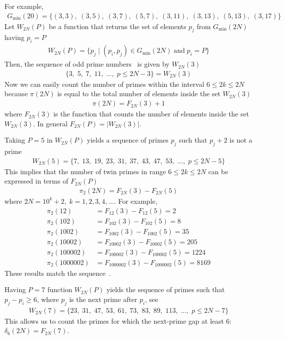 For example,
\begin{align*}
    G_{\min}(20) = \{
    (3,3),\;
    (3,5),\;
    (3,7),\;
    (5,7),\;
    (3,11),\;
    (3,13),\;
    (5,13),\;
    (3,17)
    \}
\end{align*}
Let $W_{2N}(P)$ be a function that returns the set of elements $p_j$ from $G_{\min} (2N)$ having $p_i=P$
\begin{align*}
    W_{2N}(P) = \{p_j \mid (p_i, p_j) \in G_{\min} (2N) \; \mathrm{and} \; p_i = P \}
\end{align*}
Then, the sequence of odd prime numbers~\cite{oeis:A065091} is given by $W_{2N}(3)$
\begin{align*}
    \{ 3, \; 5, \; 7, \; 11, \; \dots, \; p \leq 2N - 3\} = W_{2N}(3)
\end{align*}
Now we can easily count the number of primes within the interval $6 \leq 2k \leq 2N$ because $\pi(2N)$ is equal to
the total number of elements inside the set $W_{2N}(3)$
\begin{align*}
    \pi(2N) = F_{2N}(3) + 1
\end{align*}
where $F_{2N}(3)$ is the function that counts the number of elements inside the set $W_{2N}(3)$.
In general $F_{2N}(P) = |W_{2N}(3)|$.

Taking $P=5$ in $W_{2N}(P)$ yields a sequence of primes $p_j$ such that $p_j+2$ is not a prime~\cite{oeis:A049591}
\begin{align*}
    W_{2N}(5) = \{ 7, \; 13, \; 19, \; 23, \; 31, \; 37, \; 43, \; 47, \; 53, \; \dots, \;  p \leq 2N - 5 \}
\end{align*}
This implies that the number of twin primes in range $6 \leq 2k \leq 2N$ can be expressed in terms of $F_{2N}(P)$
\begin{align*}
    \pi_2 (2N) = F_{2N}(3) - F_{2N}(5)
\end{align*}
where $2N=10^k+2, \; k=1,2,3,4,\dots$.
For example,
\begin{align*}
    \pi_2 (12) &= F_{12}(3) - F_{12}(5) = 2 \\
    \pi_2 (102) &= F_{102}(3) - F_{102}(5) = 8 \\
    \pi_2 (1002) &= F_{1002}(3) - F_{1002}(5) = 35 \\
    \pi_2 (10002) &= F_{10002}(3) - F_{10002}(5) = 205 \\
    \pi_2 (100002) &= F_{100002}(3) - F_{100002}(5) = 1224 \\
    \pi_2 (1000002) &= F_{1000002}(3) - F_{1000002}(5) = 8169
\end{align*}
These results match the sequence~\cite{oeis_A007508}.

Having $P=7$ function $W_{2N}(P)$ yields the sequence of primes such that $p_j-p_i \geq 6$,
where $p_j$ is the next prime after $p_i$, see~\cite{oeis:A124582}
\begin{align*}
    W_{2N}(7) = \{ 23, \; 31, \;  47, \; 53, \; 61, \;  73, \; 83, \; 89, \; 113, \; \dots, \; p \leq 2N-7 \}
\end{align*}
This allows us to count the primes for which the next-prime gap at least 6: $\delta_6(2N) = F_{2N}(7)$.
